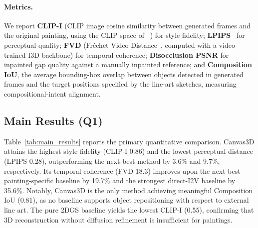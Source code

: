 \paragraph{Metrics.}
We report \textbf{CLIP-I} (CLIP image cosine similarity between
generated frames and the original painting, using the CLIP
space of \citeauthor{radford2021clip}~\cite{radford2021clip}) for style
fidelity; \textbf{LPIPS}~\cite{zhang2018lpips} for perceptual quality;
\textbf{FVD} (Fr\'echet Video Distance~\cite{unterthiner2019fvd},
computed with a video-trained I3D backbone) for temporal coherence;
\textbf{Disocclusion PSNR} for inpainted gap quality against a
manually inpainted reference; and \textbf{Composition IoU}, the
average bounding-box overlap between objects detected in generated
frames and the target positions specified by the line-art sketches,
measuring compositional-intent alignment.

\subsection{Main Results (Q1)}

Table~\ref{tab:main_results} reports the primary quantitative
comparison. Canvas3D attains the highest style fidelity (CLIP-I 0.86)
and the lowest perceptual distance (LPIPS 0.28), outperforming the
next-best method by 3.6\% and 9.7\%, respectively. Its temporal
coherence (FVD 18.3) improves upon the next-best painting-specific
baseline by 19.7\% and the strongest direct-I2V baseline by 35.6\%.
Notably, Canvas3D is the only method achieving meaningful Composition
IoU (0.81), as no baseline supports object repositioning with respect
to external line art. The pure 2DGS baseline yields the lowest CLIP-I
(0.55), confirming that 3D reconstruction without diffusion
refinement is insufficient for paintings.

